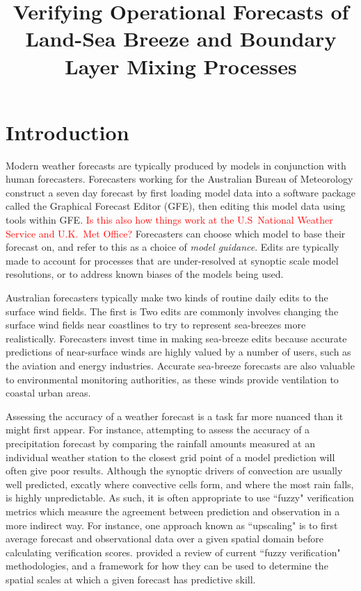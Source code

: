 \documentclass{ametsoc}
\title{Verifying Operational Forecasts of Land-Sea Breeze and Boundary Layer Mixing Processes}
\affiliation{School of Earth Sciences, and ARC Centre of Excellence for Climate Extremes, The University of Melbourne, Melbourne, Victoria, Australia.}
\begin{document}
\maketitle

\section{Introduction}\label{introduction}
Modern weather forecasts are typically produced by models in conjunction with human forecasters. Forecasters working for the Australian Bureau of Meteorology construct a seven day forecast by first loading model data into a software package called the Graphical Forecast Editor (GFE), then editing this model data using tools within GFE. \textcolor{red}{Is this also how things work at the U.S~National Weather Service and U.K.~Met Office?} Forecasters can choose which model to base their forecast on, and refer to this as a choice of \textit{model guidance}. Edits are typically made to account for processes that are under-resolved at synoptic scale model resolutions, or to address known biases of the models being used. 

Australian forecasters typically make two kinds of routine daily edits to the surface wind fields. The first is Two edits are commonly involves changing the surface wind fields near coastlines to try to represent sea-breezes more realistically. Forecasters invest time in making sea-breeze edits because accurate predictions of near-surface winds are highly valued by a number of users, such as the aviation and energy \citep{smith09} industries. Accurate sea-breeze forecasts are also valuable to environmental monitoring authorities, as these winds provide ventilation to coastal urban areas.



Assessing the accuracy of a weather forecast is a task far more nuanced than it might first appear. For instance, attempting to assess the accuracy of a precipitation forecast by comparing the rainfall amounts measured at an individual weather station to the closest grid point of a model prediction will often give poor results. Although the synoptic drivers of convection are usually well predicted, excatly where convective cells form, and where the most rain falls, is highly unpredictable. As such, it is often appropriate to use ``fuzzy" verification metrics which measure the agreement between prediction and observation in a more indirect way. For instance, one approach known as ``upscaling" is to first average forecast and observational data over a given spatial domain before calculating verification scores. \citet{ebert08} provided a review of current ``fuzzy verification" methodologies, and a framework for how they can be used to determine the spatial scales at which a given forecast has predictive skill.      
\end{document}
